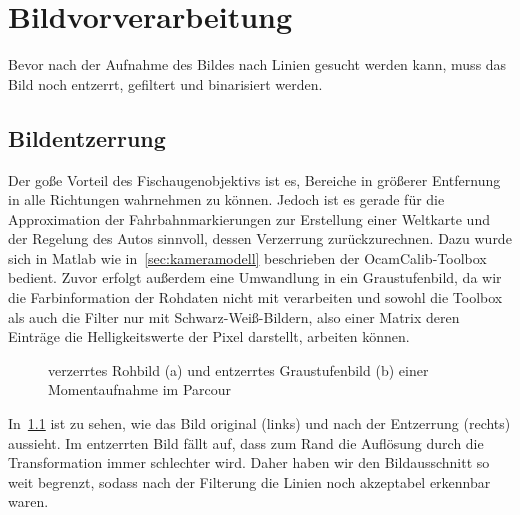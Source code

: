 \chapter{Bildvorverarbeitung}

Bevor nach der Aufnahme des Bildes nach Linien gesucht werden kann, muss das Bild noch entzerrt, gefiltert und binarisiert werden. 

\section{Bildentzerrung}

Der goße Vorteil des Fischaugenobjektivs ist es, Bereiche in größerer Entfernung in alle Richtungen  wahrnehmen zu können. Jedoch ist es gerade für die Approximation der Fahrbahnmarkierungen zur Erstellung einer Weltkarte und der Regelung des Autos sinnvoll, dessen Verzerrung zurückzurechnen. Dazu wurde sich in Matlab wie in~\ref{sec:kameramodell} beschrieben der OcamCalib-Toolbox bedient. Zuvor erfolgt außerdem eine Umwandlung in ein Graustufenbild, da wir die Farbinformation der Rohdaten nicht mit verarbeiten und sowohl die Toolbox als auch die Filter nur mit Schwarz-Weiß-Bildern, also einer Matrix deren Einträge die Helligkeitswerte der Pixel darstellt, arbeiten können. 

\begin{figure}[ht] %
  \centering
  \qquad
  \caption{verzerrtes Rohbild (a) und entzerrtes Graustufenbild (b) einer Momentaufnahme im Parcour}
\label{fig:bildvorverarbeitung_entzerren}
\end{figure} 

In~\ref{fig:bildvorverarbeitung_entzerren} ist zu sehen, wie das Bild original (links) und nach der Entzerrung (rechts) aussieht. Im entzerrten Bild fällt auf, dass zum Rand die Auflösung durch die Transformation immer schlechter wird. Daher haben wir den Bildausschnitt so weit begrenzt, sodass nach der Filterung die Linien noch akzeptabel erkennbar waren.

